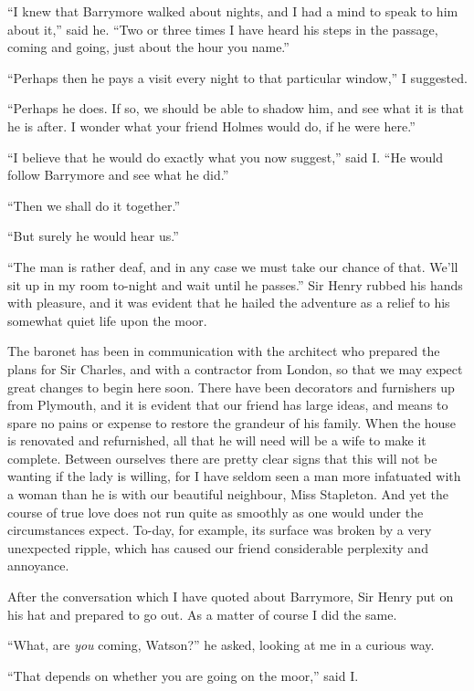 \documentclass[paper=5.5in:8.5in,BCOR=7mm,twoside,DIV=calc,12pt,usegeometry,openany,chapterprefix,endperiod]{scrbook} %
\begin{document}
\enquote{I knew that Barrymore walked about nights, and I had a mind to speak to him about it,} said he. \enquote{Two or three times I have heard his steps in the passage, coming and going, just about the hour you name.}

\enquote{Perhaps then he pays a visit every night to that particular window,} I suggested.

\enquote{Perhaps he does. If so, we should be able to shadow him, and see what it is that he is after. I wonder what your friend Holmes would do, if he were here.}

\enquote{I believe that he would do exactly what you now suggest,} said I. \enquote{He would follow Barrymore and see what he did.}

\enquote{Then we shall do it together.}

\enquote{But surely he would hear us.}

\enquote{The man is rather deaf, and in any case we must take our chance of that. We'll sit up in my room to-night and wait until he passes.} Sir Henry rubbed his hands with pleasure, and it was evident that he hailed the adventure as a relief to his somewhat quiet life upon the moor.

The baronet has been in communication with the architect who prepared the plans for Sir Charles, and with a contractor from London, so that we may expect great changes to begin here soon. There have been decorators and furnishers up from Plymouth, and it is evident that our friend has large ideas, and means to spare no pains or expense to restore the grandeur of his family. When the house is renovated and refurnished, all that he will need will be a wife to make it complete. Between ourselves there are pretty clear signs that this will not be wanting if the lady is willing, for I have seldom seen a man more infatuated with a woman than he is with our beautiful neighbour, Miss Stapleton. And yet the course of true love does not run quite as smoothly as one would under the circumstances expect. To-day, for example, its surface was broken by a very unexpected ripple, which has caused our friend considerable perplexity and annoyance.

After the conversation which I have quoted about Barrymore, Sir Henry put on his hat and prepared to go out. As a matter of course I did the same.

\enquote{What, are \emph{you} coming, Watson?} he asked, looking at me in a curious way.

\enquote{That depends on whether you are going on the moor,} said I.
\end{document}

